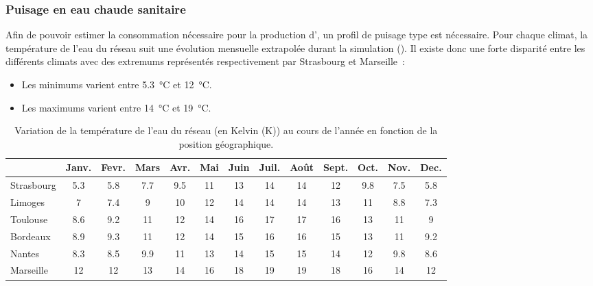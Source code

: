 \subsubsection{Puisage en eau chaude sanitaire} %
\label{ssub:puisage_en_eau_chaude_sanitaire}
Afin de pouvoir estimer la consommation nécessaire pour la production d’, un profil
de puisage type est nécessaire. Pour chaque climat, la température de l’eau du réseau suit
une évolution mensuelle extrapolée durant la simulation
(). Il existe donc une forte disparité entre les différents climats
avec des extremums représentés respectivement par Strasbourg et Marseille~:
\begin{itemize}
    \item Les minimums varient entre \SI{5.3}{\celsius} et \SI{12}{\celsius}.
    \item Les maximums varient entre \SI{14}{\celsius} et \SI{19}{\celsius}.
\end{itemize}

\begin{table}
\centering
\caption[Variation de la température de l'eau du réseau en fonction de la position géographique]
        {Variation de la température de l'eau du réseau (en Kelvin (\si{\kelvin})) au cours
         de l'année en fonction de la position géographique.}
\label{tab:temp_eau}
\begin{tabular}{l*{12}{c}}
    \toprule
               & Janv. & Fevr. & Mars & Avr. & Mai & Juin & Juil. & Août & Sept. & Oct. & Nov. & Dec. \\
    \midrule
    Strasbourg & \num{5.3}   & \num{5.8}   & \num{7.7}  & \num{9.5}  & \num{11}  & \num{13}   & \num{14}    & \num{14}   & \num{12}    & \num{9.8}  & \num{7.5}  & \num{5.8}  \\
    Limoges    & \num{7}     & \num{7.4}   & \num{9}    & \num{10}   & \num{12}  & \num{14}   & \num{14}    & \num{14}   & \num{13}    & \num{11}   & \num{8.8}  & \num{7.3}  \\
    Toulouse   & \num{8.6}   & \num{9.2}   & \num{11}   & \num{12}   & \num{14}  & \num{16}   & \num{17}    & \num{17}   & \num{16}    & \num{13}   & \num{11}   & \num{9}    \\
    Bordeaux   & \num{8.9}   & \num{9.3}   & \num{11}   & \num{12}   & \num{14}  & \num{15}   & \num{16}    & \num{16}   & \num{15}    & \num{13}   & \num{11}   & \num{9.2}  \\
    Nantes     & \num{8.3}   & \num{8.5}   & \num{9.9}  & \num{11}   & \num{13}  & \num{14}   & \num{15}    & \num{15}   & \num{14}    & \num{12}   & \num{9.8}  & \num{8.6}  \\
    Marseille  & \num{12}    & \num{12}    & \num{13}   & \num{14}   & \num{16}  & \num{18}   & \num{19}    & \num{19}   & \num{18}    & \num{16}   & \num{14}   & \num{12}   \\
    \bottomrule
\end{tabular}
\end{table}


